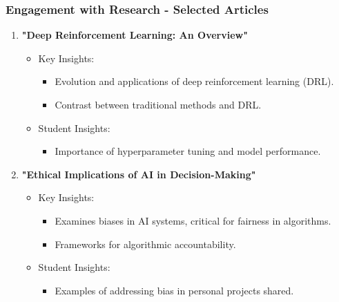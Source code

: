 \documentclass[aspectratio=169]{beamer}
\begin{document}
\begin{frame}[fragile]
    \frametitle{Engagement with Research - Selected Articles}
    \begin{enumerate}
        \item \textbf{"Deep Reinforcement Learning: An Overview"}
            \begin{itemize}
                \item Key Insights:
                    \begin{itemize}
                        \item Evolution and applications of deep reinforcement learning (DRL).
                        \item Contrast between traditional methods and DRL.
                    \end{itemize}
                \item Student Insights:
                    \begin{itemize}
                        \item Importance of hyperparameter tuning and model performance.
                    \end{itemize}
            \end{itemize}
        
        \item \textbf{"Ethical Implications of AI in Decision-Making"}
            \begin{itemize}
                \item Key Insights:
                    \begin{itemize}
                        \item Examines biases in AI systems, critical for fairness in algorithms.
                        \item Frameworks for algorithmic accountability.
                    \end{itemize}
                \item Student Insights:
                    \begin{itemize}
                        \item Examples of addressing bias in personal projects shared.
                    \end{itemize}
            \end{itemize}
        

\end{enumerate}
\end{frame}
\end{document}
